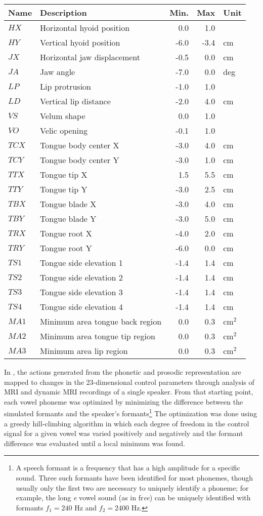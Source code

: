 \documentclass{article}
\begin{document}
\begin{tabular}{llrrl}
\toprule
{\bf Name} & {\bf Description} & {\bf Min.} & {\bf Max} & {\bf Unit} \\
\midrule
$HX$ & Horizontal hyoid position & 0.0 & 1.0 & \\
$HY$ & Vertical hyoid position & -6.0 & -3.4 & cm \\
$JX$ & Horizontal jaw displacement & -0.5 & 0.0 & cm \\
$JA$ & Jaw angle & -7.0 & 0.0 & deg \\
$LP$ & Lip protrusion & -1.0 & 1.0 & \\
$LD$ & Vertical lip distance & -2.0 & 4.0 & cm \\
$VS$ & Velum shape & 0.0 & 1.0 & \\
$VO$ & Velic opening & -0.1 & 1.0 & \\
$TCX$ & Tongue body center X & -3.0 & 4.0 & cm \\
$TCY$ & Tongue body center Y & -3.0 & 1.0 & cm \\
$TTX$ & Tongue tip X & 1.5 & 5.5 & cm \\
$TTY$ & Tongue tip Y & -3.0 & 2.5 & cm \\
$TBX$ & Tongue blade X & -3.0 & 4.0 & cm \\
$TBY$ & Tongue blade Y & -3.0 & 5.0 & cm \\
$TRX$ & Tongue root X & -4.0 & 2.0 & cm \\
$TRY$ & Tongue root Y & -6.0 & 0.0 & cm \\
$TS1$ & Tongue side elevation 1 & -1.4 & 1.4 & cm \\
$TS2$ & Tongue side elevation 2 & -1.4 & 1.4 & cm \\
$TS3$ & Tongue side elevation 3 & -1.4 & 1.4 & cm \\
$TS4$ & Tongue side elevation 4 & -1.4 & 1.4 & cm \\
$MA1$ & Minimum area tongue back region & 0.0 & 0.3 & cm$^2$ \\
$MA2$ & Minimum area tongue tip region & 0.0 & 0.3 & cm$^2$ \\
$MA3$ & Minimum area lip region & 0.0 & 0.3 & cm$^2$ \\
\bottomrule
\end{tabular}

In \citet{XXX}, the actions generated from
the phonetic and prosodic representation
are mapped to changes in
the 23-dimensional control parameters
through analysis of MRI and dynamic MRI recordings
of a single speaker.
From that starting point,
each vowel phoneme was optimized
by minimizing the difference
between the simulated formants
and the speaker's formants\footnote{A
speech formant is a frequency that
has a high amplitude for a specific sound.
Three such formants have been identified
for most phonemes, though usually only the first
two are necessary to uniquely identify
a phoneme; for example, the long \textit{e}
vowel sound (as in fr\textit{ee})
can be uniquely identified with
formants $f_1=240$ Hz and $f_2=2400$ Hz.}
The optimization
was done using a greedy hill-climbing algorithm
in which each degree of freedom in
the control signal for a given vowel
was varied positively and negatively
and the formant difference was evaluated
until a local minimum was found.
\end{document}
